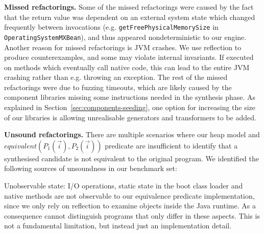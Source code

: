 \documentclass[sigconf,review,anonymous]{acmart}
\begin{document}
{\bf Missed refactorings.}
Some of the missed refactorings were caused by the fact that the return
value was dependent on an external system state which changed frequently between
invocations (e.g. \texttt{getFreePhysicalMemorySize} in \texttt{OperatingSystemMXBean}),
and thus appeared nondeterministic to our engine.
%
Another reason for missed refactorings is JVM crashes. We use reflection to produce counterexamples,
and some may violate internal invariants.
If executed on methods which eventually call native code, this can lead to the entire JVM
crashing rather than e.g. throwing an exception. %
%
The rest of the missed refactorings were due to fuzzing timeouts, which are likely 
caused by the component libraries missing some
instructions needed in the synthesis phase.
As explained in Section~\ref{sec:components-seeding}, one option 
for increasing the size of our libraries 
is allowing unrealisable generators and transformers to
be added.


{\bf Unsound refactorings.}
%
%
There are multiple scenarios where our heap model and
$equivalent(P_1(\vec{i}), P_2(\vec{i}))$ predicate are insufficient to identify
that a synthesised candidate is not equivalent to the original program. We
identified the following sources of unsoundness in our benchmark set:

Unobservable state: I/O operations, static state in the boot class loader and
native methods are not observable to our equivalence predicate implementation,
since we only rely on reflection to examine objects inside the Java runtime. As
a consequence cannot distinguish programs that only differ in these aspects.
This is not a fundamental limitation, but instead just an implementation detail.
\end{document}
